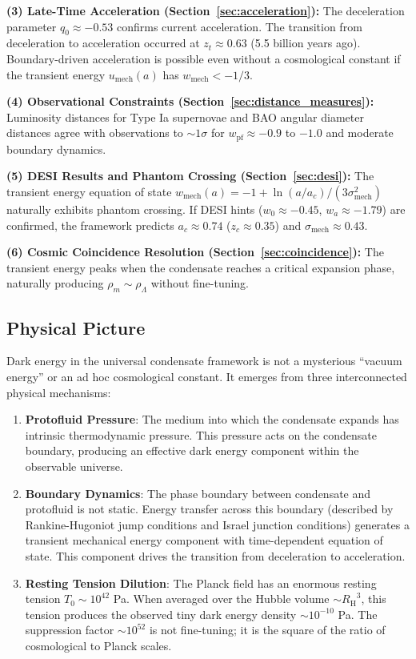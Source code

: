 \documentclass[11pt,a4paper]{article}
\newcommand{\Tzero}{\ensuremath{T_0}}
\newcommand{\RH}{\ensuremath{R_{\mathrm{H}}}}
\newcommand{\umech}{\ensuremath{u_{\mathrm{mech}}}}
\newcommand{\wmech}{\ensuremath{w_{\mathrm{mech}}}}
\newcommand{\wpf}{\ensuremath{w_{\mathrm{pf}}}}
\theoremstyle{definition}
\theoremstyle{remark}
\begin{document}
\textbf{(3) Late-Time Acceleration (Section~\ref{sec:acceleration}):} The deceleration parameter $q_0 \approx -0.53$ confirms current acceleration. The transition from deceleration to acceleration occurred at $z_t \approx 0.63$ (5.5 billion years ago). Boundary-driven acceleration is possible even without a cosmological constant if the transient energy $\umech(a)$ has $\wmech < -1/3$.

\textbf{(4) Observational Constraints (Section~\ref{sec:distance_measures}):} Luminosity distances for Type Ia supernovae and BAO angular diameter distances agree with observations to $\sim 1\sigma$ for $\wpf \approx -0.9$ to $-1.0$ and moderate boundary dynamics.

\textbf{(5) DESI Results and Phantom Crossing (Section~\ref{sec:desi}):} The transient energy equation of state $\wmech(a) = -1 + \ln(a/a_c)/(3\sigma_{\mathrm{mech}}^2)$ naturally exhibits phantom crossing. If DESI hints ($w_0 \approx -0.45$, $w_a \approx -1.79$) are confirmed, the framework predicts $a_c \approx 0.74$ ($z_c \approx 0.35$) and $\sigma_{\mathrm{mech}} \approx 0.43$.

\textbf{(6) Cosmic Coincidence Resolution (Section~\ref{sec:coincidence}):} The transient energy peaks when the condensate reaches a critical expansion phase, naturally producing $\rho_m \sim \rho_\Lambda$ without fine-tuning.

\subsection{Physical Picture}
\label{sec:physical_picture_conclusion}

Dark energy in the universal condensate framework is not a mysterious ``vacuum energy'' or an ad hoc cosmological constant. It emerges from three interconnected physical mechanisms:

\begin{enumerate}[leftmargin=*, itemsep=0.3em]
\item \textbf{Protofluid Pressure}: The medium into which the condensate expands has intrinsic thermodynamic pressure. This pressure acts on the condensate boundary, producing an effective dark energy component within the observable universe.

\item \textbf{Boundary Dynamics}: The phase boundary between condensate and protofluid is not static. Energy transfer across this boundary (described by Rankine-Hugoniot jump conditions and Israel junction conditions) generates a transient mechanical energy component with time-dependent equation of state. This component drives the transition from deceleration to acceleration.

\item \textbf{Resting Tension Dilution}: The Planck field has an enormous resting tension $\Tzero \sim 10^{42}$ Pa. When averaged over the Hubble volume $\sim \RH^3$, this tension produces the observed tiny dark energy density $\sim 10^{-10}$ Pa. The suppression factor $\sim 10^{52}$ is not fine-tuning; it is the square of the ratio of cosmological to Planck scales.
\end{enumerate}
\end{document}
